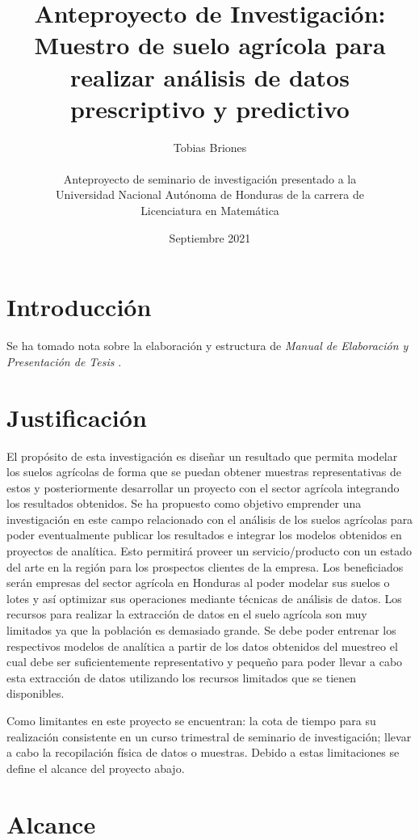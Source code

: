 \documentclass{report}
\title{Anteproyecto de Investigación: Muestro de suelo agrícola para realizar análisis de datos prescriptivo y predictivo}
\author{
Tobias Briones\\\\
Anteproyecto de seminario de investigación presentado a la\\
Universidad Nacional Autónoma de Honduras de la carrera de\\
Licenciatura en Matemática
}
\date{Septiembre 2021}
\begin{document}
\maketitle

\tableofcontents


\section{Introducción}

Se ha tomado nota sobre la elaboración y estructura de \textit{Manual de Elaboración y Presentación de Tesis} \cite{universidad-san-carlos-2016}.

\section{Justificación}

El propósito de esta investigación es diseñar un resultado que permita modelar los suelos agrícolas de forma que se puedan obtener muestras representativas de estos y posteriormente desarrollar un proyecto con el sector agrícola integrando los resultados obtenidos. Se ha propuesto como objetivo emprender una investigación en este campo relacionado con el análisis de los suelos agrícolas para poder eventualmente publicar los resultados e integrar los modelos obtenidos en proyectos de analítica. Esto permitirá proveer un servicio/producto con un estado del arte en la región para los prospectos clientes de la empresa. Los beneficiados serán empresas del sector agrícola en Honduras al poder modelar sus suelos o lotes y así optimizar sus operaciones mediante técnicas de análisis de datos. Los recursos para realizar la extracción de datos en el suelo agrícola son muy limitados ya que la población es demasiado grande. Se debe poder entrenar los respectivos modelos de analítica a partir de los datos obtenidos del muestreo el cual debe ser suficientemente representativo y pequeño para poder llevar a cabo esta extracción de datos utilizando los recursos limitados que se tienen disponibles.

\bigbreak

Como limitantes en este proyecto se encuentran: la cota de tiempo para su realización consistente en un curso trimestral de seminario de investigación; llevar a cabo la recopilación física de datos o muestras. Debido a estas limitaciones se define el alcance del proyecto abajo.

\section{Alcance}
\end{document}
